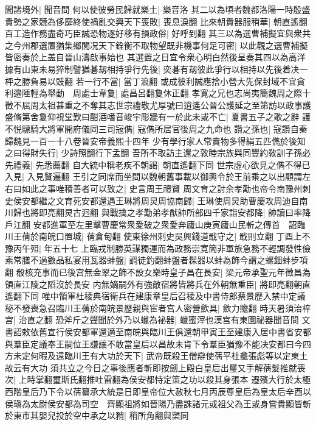 聞諸境外|{
	聞音問}
何以使彼勞民歸就樂土|{
	樂音洛}
其二以為頃者魏都洛陽一時殷盛貴勢之家競為侈靡終使禍亂交興天下喪敗|{
	喪息淚翻}
比來朝貴器服稍華|{
	朝直遙翻}
百工造作務盡奇巧臣誠恐物逐好移有損政俗|{
	好呼到翻}
其三以為選曹補擬宜與衆共之今州郡選置猶集鄉閭况天下銓衡不取物望既非機事何足可密|{
	以此觀之選曹補擬皆密奏於上盖自晉山濤啟事始也}
其選置之日宜令衆心明白然後呈奏其四以為高洋據有山東未易猝制譬猶碁刼相持爭行先後|{
	奕碁有刼彼此爭行以相持以先後着决一枰之勝負易以豉翻}
若一行不當|{
	當丁浪翻}
或成彼利誠應捨小營大先保封域不宜貪利邉陲輕為舉動　周處士韋夐|{
	處昌呂翻夐休正翻}
孝寛之兄也志尚夷簡魏周之際十徵不屈周太祖甚重之不奪其志世宗禮敬尤厚號曰逍遙公晉公護延之至第訪以政事護盛脩第舍夐仰視堂歎曰酣酒嗜音峻宇彫牆有一於此未或不亡|{
	夏書五子之歌之辭}
護不悦驃騎大將軍開府儀同三司宼儁|{
	寇儁所居官後周之九命也}
讚之孫也|{
	寇讚自秦歸魏見一百一十八卷晉安帝義熙十四年}
少有學行家人常賣物多得絹五匹儁於後知之曰得財失行|{
	少詩照翻行下孟翻}
吾所不取訪主還之敦睦宗族與同豐約敎訓子孫必先禮義|{
	先悉薦翻}
自大統中稱老疾不朝謁|{
	朝直遙翻下同}
世宗虛心欲見之儁不得已入見|{
	入見賢遍翻}
王引之同席而坐問以魏朝舊事載以御輿令於王前乘之以出顧謂左右曰如此之事唯積善者可以致之|{
	史言周王禮賢}
周文育之討余孝勱也帝令南豫州刺史侯安都繼之文育死安都還遇王琳將周炅周協南歸|{
	王琳使周炅助曹慶攻周迪自南川歸也將即亮翻炅古迥翻}
與戰擒之孝勱弟孝猷帥所部四千家詣安都降|{
	帥讀曰率降戶江翻}
安都進軍至左里擊曹慶常衆愛破之衆愛奔廬山庚寅廬山民斬之傳首　詔臨川王蒨於南皖口置城|{
	蒨倉甸翻}
使東徐州刺史吳興錢道戢守之|{
	戢則立翻}
丁酉上不豫丙午殂|{
	年五十七}
上臨戎制勝英謀獨運而為政務崇寛簡非軍旅急務不輕調發性儉素常膳不過數品私宴用瓦器蚌盤|{
	調徒釣翻蚌盤者髹器以蚌為飾今謂之螺鈿蚌步項翻}
殽核充事而已後宫無金翠之飾不設女樂時皇子昌在長安|{
	梁元帝承聖元年徵昌為領直江陵之䧟沒於長安}
内無嫡嗣外有強敵宿將皆將兵在外朝無重臣|{
	將即亮翻朝直遙翻下同}
唯中領軍杜稜典宿衛兵在建康章皇后召稜及中書侍郎蔡景歷入禁中定議秘不發喪急召臨川王蒨於南皖景歷親與宦者宫人密營歛具|{
	歛力贍翻}
時天暑須治梓宫|{
	治直之翻}
恐斧斤之聲聞於外乃以蠟為袐器|{
	蠟蜜滓也漢宫有東園祕器聞音問}
文書詔敕依舊宣行侯安都軍還適至南皖與臨川王俱還朝甲寅王至建康入居中書省安都與羣臣定議奉王嗣位王謙讓不敢當皇后以昌故未肯下令羣臣猶豫不能决安都曰今四方未定何暇及遠臨川王有大功於天下|{
	武帝既殺王僧辯使蒨平杜龕張彪等以定東土故云有大功}
須共立之今日之事後應者斬即按劒上殿白皇后出璽又手解蒨髮推就喪次|{
	上時掌翻璽斯氏翻推吐雷翻為侯安都恃定策之功以殺其身張本}
遷殯大行於太極西階皇后乃下令以蒨纂承大統是日即皇帝位大赦秋七月丙辰尊皇后為皇太后辛酉以侯瑱為太尉侯安都為司空　齊顯祖將如晉陽乃盡誅諸元或祖父為王或身嘗貴顯皆斬於東市其嬰兒投於空中承之以矟|{
	稍所角翻與槊同}

